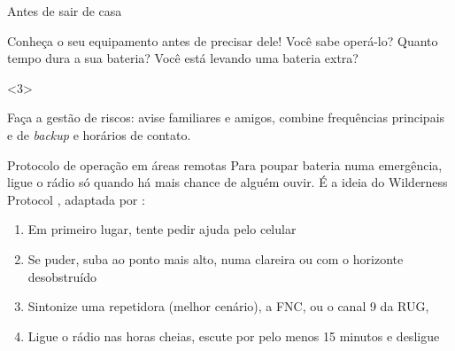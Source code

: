 \begin{frame}{Antes de sair de casa}
  \begin{atencao}
    \alert{Conheça o seu equipamento} antes de precisar dele! \pause Você sabe operá-lo? Quanto tempo dura a sua bateria? Você está levando uma bateria extra?
  \end{atencao}

  \begin{uncoverenv}<3>
    \begin{atencao}
      Faça a \alert{gestão de riscos}: avise familiares e amigos, combine frequências principais e de \emph{backup} e horários de contato.
    \end{atencao}
  \end{uncoverenv}
\end{frame}

\begin{frame}{Protocolo de operação em áreas remotas}
  Para poupar bateria numa emergência, ligue o rádio só quando há mais chance de alguém ouvir.
  É a ideia do \alert{Wilderness Protocol} \citep{w2jts}, adaptada por \citet{salvatti2024}:

  \medskip
  \begin{enumerate}
  \item Em primeiro lugar, \alert{tente pedir ajuda pelo celular}
  \item Se puder, suba ao ponto mais alto, numa clareira ou com o horizonte desobstruído
  \item Sintonize uma repetidora (melhor cenário), a FNC,  ou o canal 9 da RUG, 
  \item Ligue o rádio nas \alert{horas cheias}, escute por pelo menos 15 minutos e desligue
  \end{enumerate}

  \smallskip
\end{frame}

